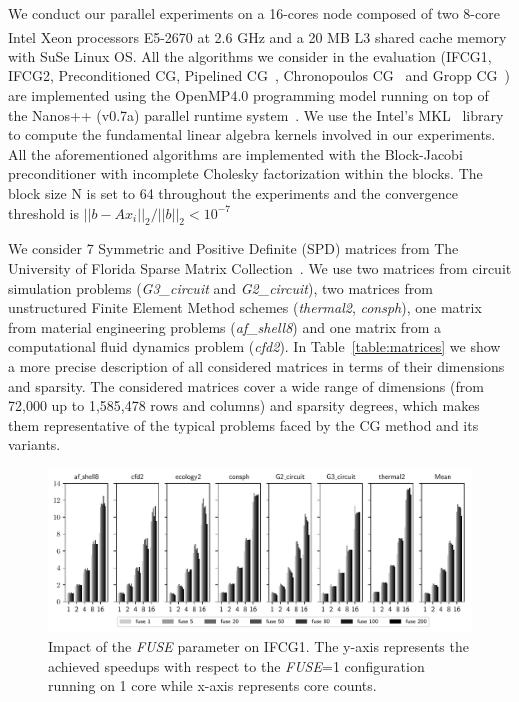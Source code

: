 We conduct our parallel experiments on a 16-cores node composed of two 8-core Intel Xeon\textsuperscript{\textregistered} processors E5-2670 at 2.6 GHz and a 20 MB L3 shared cache memory with SuSe Linux OS. 
All the algorithms we consider in the evaluation (IFCG1, IFCG2, Preconditioned CG, Pipelined CG~\cite{ghysels14}, Chronopoulos CG~\cite{chronopoulos89} and 
Gropp CG~\cite{gropp10}) are implemented using the OpenMP4.0 programming model running on top of the Nanos++ (v0.7a) parallel runtime system~\cite{nanos}. 
We use the Intel's MKL~\cite{mkl} library to compute the fundamental linear algebra kernels involved in our experiments. 
All the aforementioned algorithms are implemented with the Block-Jacobi preconditioner with incomplete Cholesky factorization within the blocks. The block size N is 
set to 64 throughout the experiments and the convergence threshold is $||b-Ax_{i}||_{2}/||b||_{2} < 10^{-7}$

We consider 7 Symmetric and Positive Definite (SPD) matrices from The University of Florida Sparse Matrix Collection~\cite{florida}.
We use two matrices from circuit simulation problems (\emph{G3\_circuit} and \emph{G2\_circuit}), two matrices from unstructured Finite Element Method schemes (\emph{thermal2}, \emph{consph}), one matrix from material engineering problems (\emph{af\_shell8}) and one matrix from a computational fluid dynamics problem (\emph{cfd2}). %
In Table~\ref{table:matrices} we show a more precise description of all considered matrices in terms of their dimensions and sparsity.
The considered matrices cover a wide range of dimensions (from 72,000 up to 1,585,478 rows and columns) and sparsity degrees, which makes them representative of the typical problems faced by the CG method and its variants.


\begin{figure}[bhtp]
        \centerline{\includegraphics[width=\textwidth, trim={0cm 0 0cm 0},clip]{ifcg/figs/mn3_fuse/cg_speedup_bar_nd.pdf}}
        \caption{Impact of the \emph{FUSE} parameter on IFCG1. The y-axis represents the achieved speedups with respect to the \emph{FUSE}=1 configuration running on 1 core while x-axis represents core counts.}
        \label{fuse}
\end{figure}



